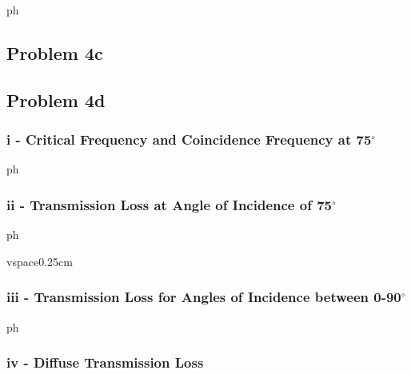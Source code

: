 {{ph



\newpage
\subsection*{Problem 4c}



\subsection*{Problem 4d}

\vspace{0.25cm}
\subsubsection*{i - Critical Frequency and Coincidence Frequency at 75$^\circ$}

ph

\vspace{0.25cm}
\subsubsection*{ii - Transmission Loss at Angle of Incidence of 75$^\circ$}

ph

vspace{0.25cm}
\subsubsection*{iii - Transmission Loss for Angles of Incidence between 0-90$^\circ$}

ph

\vspace{0.25cm}
\subsubsection*{iv - Diffuse Transmission Loss}







}}
